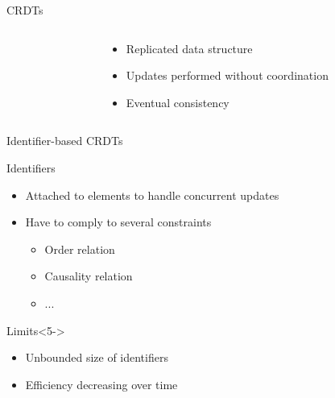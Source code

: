 \documentclass[10pt]{beamer}
\begin{document}
\begin{frame}{\acfp{CRDT}}
\begin{columns}
\begin{column}{0.6\textwidth}
    \end{column}
    \begin{column}{0.4\textwidth}
      \begin{itemize}
        \item Replicated data structure
        \item<2-> Updates performed without coordination
        \item<3-> Eventual consistency
      \end{itemize}
    \end{column}
  \end{columns}
\end{frame}

\begin{frame}{Identifier-based \acp{CRDT}}
  \begin{block}{Identifiers}
    \begin{itemize}
      \item Attached to elements to handle concurrent updates
      \item Have to comply to several constraints
      \begin{itemize}
        \item<2-> Order relation
        \item<3-> Causality relation
        \item<4-> ...
      \end{itemize}
    \end{itemize}
  \end{block}
  \begin{alertblock}{Limits}<5->
    \begin{itemize}
      \item Unbounded size of identifiers
      \item Efficiency decreasing over time
    \end{itemize}
  \end{alertblock}
\end{frame}
\end{document}
